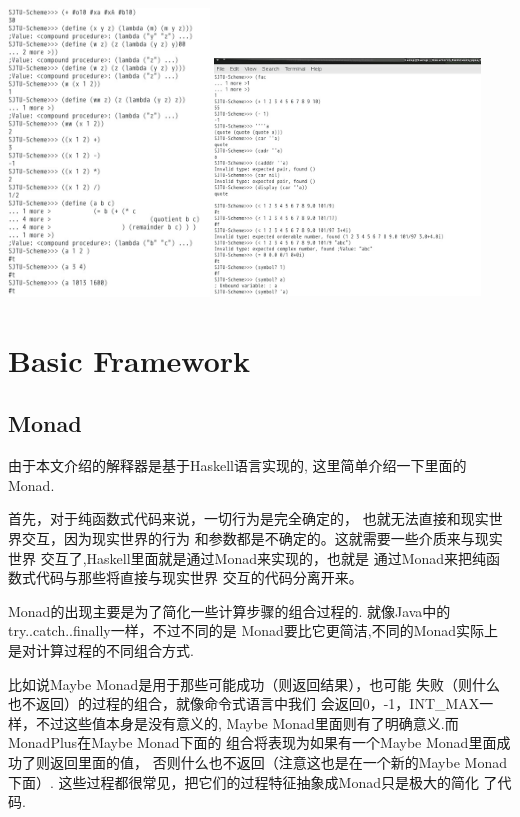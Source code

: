 \documentclass[11pt]{article}
\theoremstyle{definition}
\theoremstyle{remark}
\numberwithin{equation}{section}
\begin{document}
\begin{center}
    \includegraphics[width=0.40\textwidth]{f.jpg}
    \includegraphics[width=0.53\textwidth]{e.jpg}
  \end{center}

\section{Basic Framework}
\subsection{Monad}
由于本文介绍的解释器是基于Haskell语言实现的,
这里简单介绍一下里面的Monad.

首先，对于纯函数式代码来说，一切行为是完全确定的，
也就无法直接和现实世界交互，因为现实世界的行为
和参数都是不确定的。这就需要一些介质来与现实世界
交互了,Haskell里面就是通过Monad来实现的，也就是
通过Monad来把纯函数式代码与那些将直接与现实世界
交互的代码分离开来。

Monad的出现主要是为了简化一些计算步骤的组合过程的.
就像Java中的try..catch..finally一样，不过不同的是
Monad要比它更简洁,不同的Monad实际上是对计算过程的不同组合方式.

比如说Maybe Monad是用于那些可能成功（则返回结果），也可能
失败（则什么也不返回）的过程的组合，就像命令式语言中我们
会返回0，-1，INT\_MAX一样，不过这些值本身是没有意义的,
Maybe Monad里面则有了明确意义.而MonadPlus在Maybe Monad下面的
组合将表现为如果有一个Maybe Monad里面成功了则返回里面的值，
否则什么也不返回（注意这也是在一个新的Maybe Monad下面）.
这些过程都很常见，把它们的过程特征抽象成Monad只是极大的简化
了代码.
\end{document}
